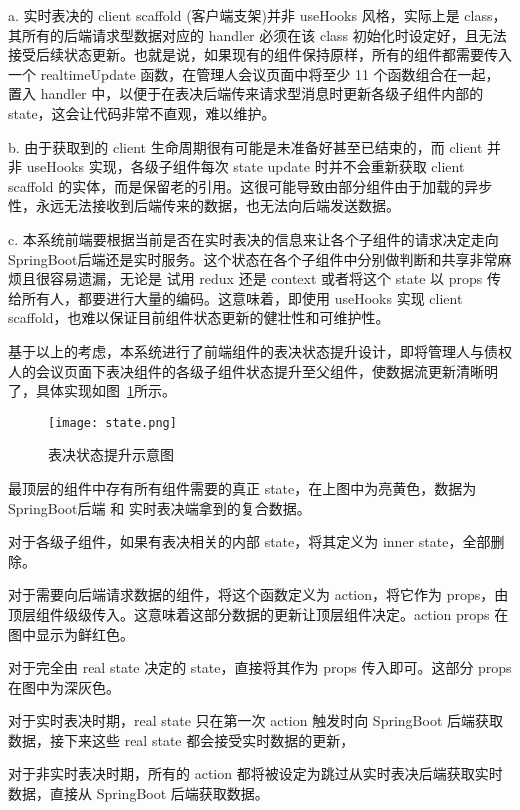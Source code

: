   \quad{}a. 实时表决的 client scaffold (客户端支架)并非 useHooks 风格，实际上是 class，其所有的后端请求型数据对应的 handler 必须在该 class 初始化时设定好，且无法接受后续状态更新。也就是说，如果现有的组件保持原样，所有的组件都需要传入一个 realtimeUpdate 函数，在管理人会议页面中将至少 11 个函数组合在一起，置入 handler 中，以便于在表决后端传来请求型消息时更新各级子组件内部的 state，这会让代码非常不直观，难以维护。

  \quad{}b. 由于获取到的 client 生命周期很有可能是未准备好甚至已结束的，而 client 并非 useHooks 实现，各级子组件每次 state update 时并不会重新获取 client scaffold 的实体，而是保留老的引用。这很可能导致由部分组件由于加载的异步性，永远无法接收到后端传来的数据，也无法向后端发送数据。

  \quad{}c. 本系统前端要根据当前是否在实时表决的信息来让各个子组件的请求决定走向 SpringBoot后端还是实时服务。这个状态在各个子组件中分别做判断和共享非常麻烦且很容易遗漏，无论是 试用 redux 还是 context 或者将这个 state 以 props 传给所有人，都要进行大量的编码。这意味着，即使用 useHooks 实现 client scaffold，也难以保证目前组件状态更新的健壮性和可维护性。

  基于以上的考虑，本系统进行了前端组件的表决状态提升设计，即将管理人与债权人的会议页面下表决组件的各级子组件状态提升至父组件，使数据流更新清晰明了，具体实现如图~\ref{fig:state}所示。

  \begin{figure}[!htp]
    \centering
    \texttt{[image: state.png]}
    \caption{表决状态提升示意图}
   \label{fig:state}
  \end{figure}

  最顶层的组件中存有所有组件需要的真正 state，在上图中为亮黄色，数据为 SpringBoot后端 和 实时表决端拿到的复合数据。

  对于各级子组件，如果有表决相关的内部 state，将其定义为 inner state，全部删除。

  对于需要向后端请求数据的组件，将这个函数定义为 action，将它作为 props，由顶层组件级级传入。这意味着这部分数据的更新让顶层组件决定。action props 在图中显示为鲜红色。

  对于完全由 real state 决定的 state，直接将其作为 props 传入即可。这部分 props 在图中为深灰色。

对于实时表决时期，real state 只在第一次 action 触发时向 SpringBoot 后端获取数据，接下来这些 real state 都会接受实时数据的更新，

对于非实时表决时期，所有的 action 都将被设定为跳过从实时表决后端获取实时数据，直接从 SpringBoot 后端获取数据。